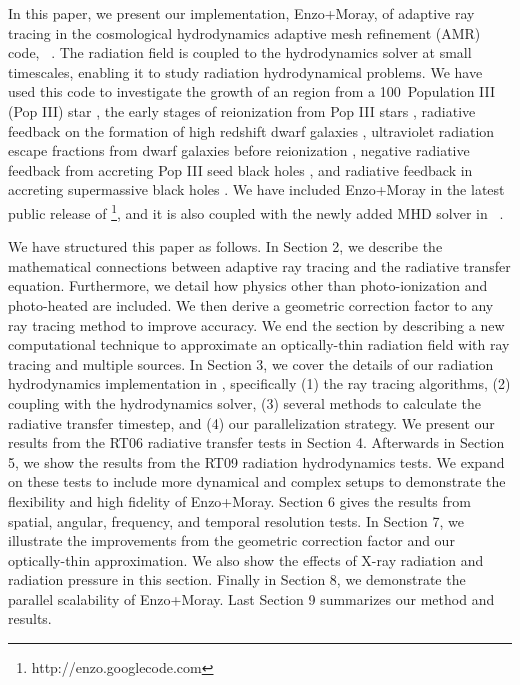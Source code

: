 \documentclass[useAMS,usenatbib]{mn2e}
\begin{document}
In this paper, we present our implementation, Enzo+Moray, of adaptive
ray tracing \citep{Abel02_RT} in the cosmological hydrodynamics
adaptive mesh refinement (AMR) code, \enzo~\citep{BryanNorman1997,
  OShea2004}.  The radiation field is coupled to the hydrodynamics
solver at small timescales, enabling it to study radiation
hydrodynamical problems.  We have used this code to investigate the
growth of an \hii region from a 100\Ms~Population III (Pop III) star
\citep{Abel07}, the early stages of reionization from Pop III stars
\citep{Wise08_Reion}, radiative feedback on the formation of high
redshift dwarf galaxies \citep{Wise08_Gal}, ultraviolet radiation
escape fractions from dwarf galaxies before reionization
\citep{Wise09}, negative radiative feedback from accreting Pop III
seed black holes \citep{Alvarez09}, and radiative feedback in
accreting supermassive black holes \citep[][in prep.]{Kim11}.  We have
included Enzo+Moray in the latest public release of
\enzo\footnote{http://enzo.googlecode.com}, and it is also coupled
with the newly added MHD solver in \enzo~\citep{Wang09}.

We have structured this paper as follows.  In Section 2, we describe
the mathematical connections between adaptive ray tracing and the
radiative transfer equation.  Furthermore, we detail how physics other
than photo-ionization and photo-heated are included.  We then derive a
geometric correction factor to any ray tracing method to improve
accuracy.  We end the section by describing a new computational
technique to approximate an optically-thin radiation field with ray
tracing and multiple sources.  In Section 3, we cover the details of
our radiation hydrodynamics implementation in \enzo, specifically (1)
the ray tracing algorithms, (2) coupling with the hydrodynamics
solver, (3) several methods to calculate the radiative transfer
timestep, and (4) our parallelization strategy.  We present our
results from the RT06 radiative transfer tests in Section 4.
Afterwards in Section 5, we show the results from the RT09 radiation
hydrodynamics tests.  We expand on these tests to include more
dynamical and complex setups to demonstrate the flexibility and high
fidelity of Enzo+Moray.  Section 6 gives the results from spatial,
angular, frequency, and temporal resolution tests.  In Section 7, we
illustrate the improvements from the geometric correction factor and
our optically-thin approximation.  We also show the effects of X-ray
radiation and radiation pressure in this section.  Finally in Section
8, we demonstrate the parallel scalability of Enzo+Moray.  Last
Section 9 summarizes our method and results.
\end{document}
